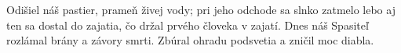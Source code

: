Odišiel náš pastier, prameň živej vody; pri jeho odchode sa slnko zatmelo
\versseparator
lebo aj ten sa dostal do zajatia, čo držal prvého človeka v zajatí. Dnes náš Spasiteľ rozlámal brány a závory smrti.
\versseparator
Zbúral ohradu podsvetia a zničil moc diabla.